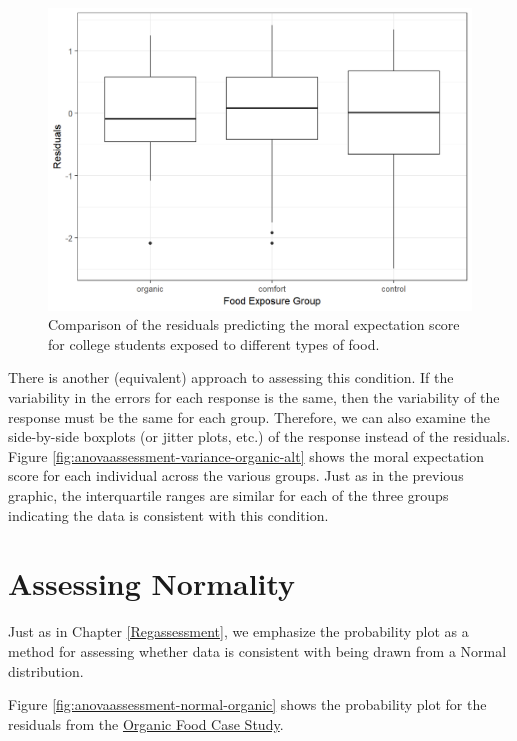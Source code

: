 \documentclass[]{book}
\theoremstyle{plain}
\theoremstyle{mydefn}
\theoremstyle{myexmpl}
\theoremstyle{remark}
\begin{document}
\begin{figure}

{\centering \includegraphics[width=0.8\linewidth]{./Images/anovaassessment-variance-organic-1} 

}

\caption{Comparison of the residuals predicting the moral expectation score for college students exposed to different types of food.}\label{fig:anovaassessment-variance-organic}
\end{figure}

There is another (equivalent) approach to assessing this condition. If
the variability in the errors for each response is the same, then the
variability of the response must be the same for each group. Therefore,
we can also examine the side-by-side boxplots (or jitter plots, etc.) of
the response instead of the residuals. Figure
\ref{fig:anovaassessment-variance-organic-alt} shows the moral
expectation score for each individual across the various groups. Just as
in the previous graphic, the interquartile ranges are similar for each
of the three groups indicating the data is consistent with this
condition.

\section{Assessing Normality}\label{assessing-normality-1}

Just as in Chapter \ref{Regassessment}, we emphasize the probability
plot as a method for assessing whether data is consistent with being
drawn from a Normal distribution.

Figure \ref{fig:anovaassessment-normal-organic} shows the probability
plot for the residuals from the \protect\hyperlink{CaseOrganic}{Organic
Food Case Study}.
\end{document}
